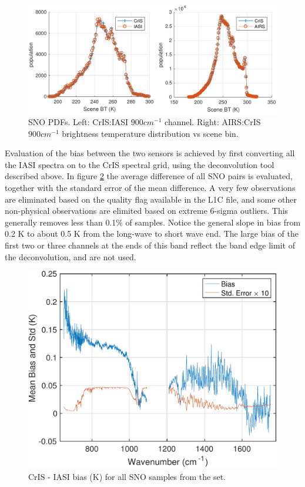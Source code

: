 \documentclass[twocolumn,10pt]{article}
\begin{document}
\begin{figure}[htb]
\centering
\includegraphics[width=\linewidth]{./figs/ac_ic_jpl_sno_900wn_hist.pdf}
\caption{
  SNO PDFs. Left: CrIS:IASI $900 cm^{-1}$ channel. Right: AIRS:CrIS $900 cm^{-1}$ brightness temperature distribution vs scene bin.}
\label{fig:X2}
\end{figure}

Evaluation of the bias between the two sensors is achieved by first converting all the
IASI spectra on to the CrIS spectral grid, using the deconvolution tool described above.
In figure \ref{fig:X3} the average difference of all SNO pairs
is evaluated, together with the standard error of the mean difference. A very few
observations are eliminated based on the quality flag available in the L1C file, and some other non-physical observations are elimited based on extreme 6-sigma outliers. This generally removes less than  0.1\%  of samples. Notice the general slope in bias from 0.2 K to about 0.5 K from the long-wave to short wave end. The large bias of the first two or three channels at the ends of this band reflect the band edge limit of the deconvolution, and are not used.

\begin{figure}[htb]
  \centering
  \includegraphics[width=\linewidth]{./figs/fig5_singlecolumn.pdf} 
  \caption{CrIS - IASI bias (K) for all SNO samples from the set.}
  \label{fig:X3}
\end{figure}
\end{document}
